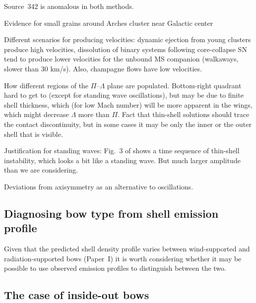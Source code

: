 Source~342 is anomalous in both methods.

Evidence for small grains around Arches cluster near Galactic center \citep{Hankins:2017a}



Different scenarios for producing velocities: dynamic ejection from
young clusters \citep{Hoogerwerf:2001a, Oh:2016c} produce high
velocities, dissolution of binary systems following core-collapse SN
\citep{Renzo:2018a} tend to produce lower velocities for the unbound
MS companion (walkaways, slower than 30 km/s).  Also, champagne flows
have low velocities.

How different regions of the \(\Pi\)--\(\Lambda\) plane are populated.
Bottom-right quadrant hard to get to (except for standing wave
oscillations), but may be due to finite shell thickness, which (for
low Mach number) will be more apparent in the wings, which might
decrease \(\Lambda\) more than \(\Pi\).  Fact that thin-shell solutions should
trace the contact discontinuity, but in some cases it may be only the
inner or the outer shell that is visible.

Justification for standing waves: Fig.~3 of \citet{Meyer:2016a} shows
a time sequence of thin-shell instability, which looks a bit like a
standing wave. But much larger amplitude than we are considering.

Deviations from axisymmetry as an alternative to oscillations. 

\subsection{Diagnosing bow type from shell emission profile}
\label{sec:diagnosing-bow-type}

Given that the predicted shell density profile varies between
wind-supported and radiation-supported bows (Paper~I) it is worth
considering whether it may be possible to use observed emission
profiles to distinguish between the two.



\subsection{The case of inside-out bows}
\label{sec:case-inside-out}

